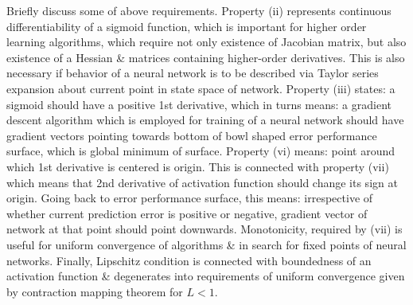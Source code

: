\documentclass{article}
\begin{document}
\begin{enumerate}
\begin{itemize}
\begin{itemize}
			Briefly discuss some of above requirements. Property (ii) represents continuous differentiability of a sigmoid function, which is important for higher order learning algorithms, which require not only existence of Jacobian matrix, but also existence of a Hessian \& matrices containing higher-order derivatives. This is also necessary if behavior of a neural network is to be described via Taylor series expansion about current point in state space of network. Property (iii) states: a sigmoid should have a positive 1st derivative, which in turns means: a gradient descent algorithm which is employed for training of a neural network should have gradient vectors pointing towards bottom of bowl shaped error performance surface, which is global minimum of surface. Property (vi) means: point around which 1st derivative is centered is origin. This is connected with property (vii) which means that 2nd derivative of activation function should change its sign at origin. Going back to error performance surface, this means: irrespective of whether current prediction error is positive or negative, gradient vector of network at that point should point downwards. Monotonicity, required by (vii) is useful for uniform convergence of algorithms \& in search for fixed points of neural networks. Finally, Lipschitz condition is connected with boundedness of an activation function \& degenerates into requirements of uniform convergence given by contraction mapping theorem for $L < 1$.
			

\end{itemize}
\end{itemize}
\end{enumerate}
\end{document}
